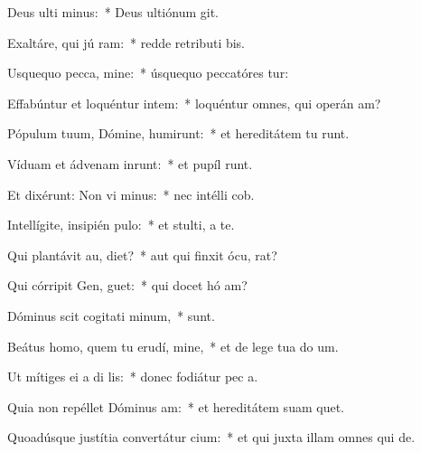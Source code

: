 \item Deus ulti minus:~* Deus ultiónum  git.
\item Exaltáre, qui jú ram:~* redde retributi bis.
\item Usquequo pecca, mine:~* úsquequo peccatóres tur:
\item Effabúntur et loquéntur intem:~* loquéntur omnes, qui operán am?
\item Pópulum tuum, Dómine, humirunt:~* et hereditátem tu runt.
\item Víduam et ádvenam inrunt:~* et pupíl runt.
\item Et dixérunt: Non vi minus:~* nec intélli  cob.
\item Intellígite, insipién  pulo:~* et stulti, a te.
\item Qui plantávit au,  diet?~* aut qui finxit ócu,  rat?
\item Qui córripit Gen,  guet:~* qui docet hó am?
\item Dóminus scit cogitati minum,~*   sunt.
\item Beátus homo, quem tu erudí, mine,~* et de lege tua do um.
\item Ut mítiges ei a di lis:~* donec fodiátur pec a.
\item Quia non repéllet Dóminus  am:~* et hereditátem suam  quet.
\item Quoadúsque justítia convertátur  cium:~* et qui juxta illam omnes qui   de.
